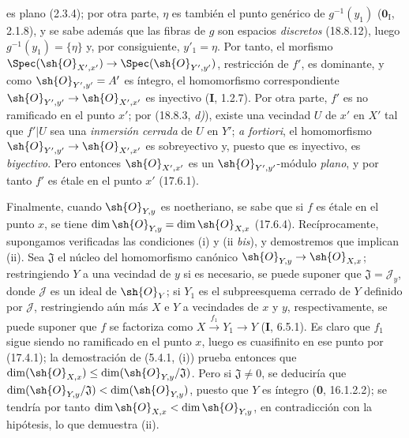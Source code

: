
es plano (2.3.4); por otra parte, $\eta$ es también el punto genérico de $g^{-1}(y_1)$ ($\mathbf{0}_{\mathrm I}$, 2.1.8), y se sabe además que las fibras de $g$ son espacios \emph{discretos} (18.8.12), luego $g^{-1}(y_1)=\{\eta\}$ y, por consiguiente, $y'_1=\eta$. Por tanto, el morfismo $\Spec(\sh{O}_{X',x'})\to\Spec(\sh{O}_{Y',y'})$, restricción de $f'$, es dominante, y como $\sh{O}_{Y',y'}=A'$ es íntegro, el homomorfismo correspondiente $\sh{O}_{Y',y'}\to\sh{O}_{X',x'}$ es inyectivo (\textbf I, 1.2.7). Por otra parte, $f'$ es no ramificado en el punto $x'$; por (18.8.3, \emph{d)}), existe una vecindad $U$ de $x'$ en $X'$ tal que $f'|U$ sea una \emph{inmersión cerrada} de $U$ en $Y'$; \emph{a fortiori}, el homomorfismo $\sh{O}_{Y',y'}\to\sh{O}_{X',x'}$ es sobreyectivo y, puesto que es inyectivo, es \emph{biyectivo}. Pero entonces $\sh{O}_{X',x'}$ es un $\sh{O}_{Y',y'}$-módulo \emph{plano}, y por tanto $f'$ es étale en el punto $x'$ (17.6.1).

Finalmente, cuando $\sh{O}_{Y,y}$ es noetheriano, se sabe que si $f$ es étale en el punto $x$, se tiene $\dim\sh{O}_{Y,y}=\dim\sh{O}_{X,x}$ (17.6.4). Recíprocamente, supongamos verificadas las condiciones (i) y (ii \emph{bis}), y demostremos que implican (ii). Sea $\mathfrak J$ el núcleo del homomorfismo canónico $\sh{O}_{Y,y}\to\sh{O}_{X,x}$; restringiendo $Y$ a una vecindad de $y$ si es necesario, se puede suponer que $\mathfrak J=\mathscr{J}_y$, donde $\mathscr{J}$ es un ideal de $\sh{O}_Y$; si $Y_1$ es el subpreesquema cerrado de $Y$ definido por $\mathscr{J}$, restringiendo aún más $X$ e $Y$ a vecindades de $x$ y $y$, respectivamente, se puede suponer que $f$ se factoriza como $X\xrightarrow{f_1}Y_1\to Y$ (\textbf I, 6.5.1). Es claro que $f_1$ sigue siendo no ramificado en el punto $x$, luego es cuasifinito en ese punto por (17.4.1); la demostración de (5.4.1, (i)) prueba entonces que $\dim(\sh{O}_{X,x})\leq\dim(\sh{O}_{Y,y}/\mathfrak J)$. Pero si $\mathfrak J\neq0$, se deduciría que $\dim(\sh{O}_{Y,y}/\mathfrak J)<\dim(\sh{O}_{Y,y})$, puesto que $Y$ es íntegro (\textbf 0, 16.1.2.2); se tendría por tanto $\dim\sh{O}_{X,x}<\dim\sh{O}_{Y,y}$, en contradicción con la hipótesis, lo que demuestra (ii).

